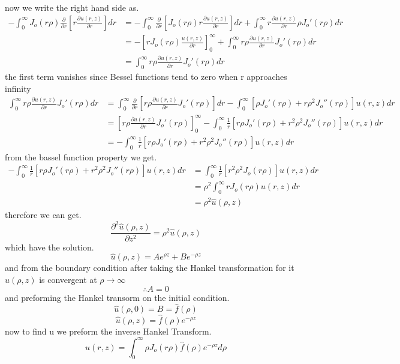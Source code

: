 \documentclass[]{article}
\begin{document}
now we write the right hand side as.
\begin{align*}
-\int_{0}^{\infty}J_o(r\rho)\frac{\partial}{\partial r}\left[r\frac{\partial u(r,z)}{\partial r}\right]dr &= -\int_{0}^{\infty}\frac{\partial}{\partial r}\left[J_o(r\rho)r\frac{\partial u(r,z)}{\partial r}\right]dr + \int_{0}^{\infty} r\frac{\partial u(r,z)}{\partial r} \rho J_o'(r\rho)dr
\\
&= -\left[rJ_o(r\rho)\frac{u(r,z)}{\partial r}\right]_{0}^{\infty} + \int_{0}^{\infty} r\rho\frac{\partial u(r,z)}{\partial r} J_o'(r\rho)dr
\\
&= \int_{0}^{\infty} r\rho\frac{\partial u(r,z)}{\partial r} J_o'(r\rho)dr
\end{align*}
the first term vanishes since Bessel functions tend to zero when r approaches infinity
\begin{align*}
\int_{0}^{\infty} r\rho\frac{\partial u(r,z)}{\partial r} J_o'(r\rho)dr
&= \int_{0}^{\infty} \frac{\partial}{\partial r}\left[ r\rho\frac{\partial u(r,z)}{\partial r} J_o'(r\rho)\right]dr 
- \int_{0}^{\infty} \left[\rho J_o'(r\rho)+ r\rho^2 J_o''(r\rho)\right] u(r,z)dr
\\
&= \left[ r\rho\frac{\partial u(r,z)}{\partial r} J_o'(r\rho)\right]_{0}^{\infty} - \int_{0}^{\infty} \frac{1}{r}\left[r\rho J_o'(r\rho)+ r^2\rho^2 J_o''(r\rho)\right] u(r,z)dr
\\
&= - \int_{0}^{\infty} \frac{1}{r}\left[r\rho J_o'(r\rho)+ r^2\rho^2 J_o''(r\rho)\right] u(r,z)dr
\end{align*}
from the bassel function property we get.
\begin{align*}
- \int_{0}^{\infty} \frac{1}{r}\left[r\rho J_o'(r\rho)+ r^2\rho^2 J_o''(r\rho)\right] u(r,z)dr &= \int_{0}^{\infty} \frac{1}{r}\left[r^2\rho^2 J_o(r\rho)\right] u(r,z)dr
\\
&= \rho^2 \int_{0}^{\infty} r J_o(r\rho) u(r,z)dr
\\
&= \rho^2 \hat{u}(\rho,z)
\end{align*}
therefore we can get.
\[
    \frac{\partial^2 \hat{u}(\rho,z)}{\partial z^2} = \rho^2 \hat{u}(\rho,z)    
\]
which have the solution. 
\[
\hat{u}(\rho,z) = A e^{\rho z} + Be^{-\rho z}    
\]
and from the boundary condition after taking the Hankel transformation for it $\hat{u}(\rho,z)$ is convergent at $\rho \to \infty$
\[
\therefore A = 0    
\]
and preforming the Hankel transorm on the initial condition.
\[
\hat{u}(\rho,0) = B = \hat{f}(\rho)    
\]
\[
\hat{u}(\rho,z) = \hat{f}(\rho)e^{-\rho z}    
\]
now to find u we preform the inverse Hankel Transform.
\[
u(r,z) = \int_{0}^{\infty} \rho J_o(r\rho)\hat{f}(\rho)e^{-\rho z} d\rho    
\]
\end{document}
